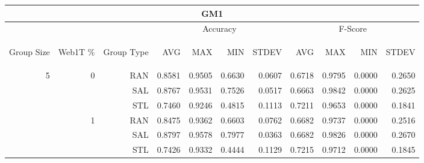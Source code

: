 \begin{center}
\begin{table}[htbp] 
 \begin{center}
\begin{tabular}{ | r | r | r | r | r | r | r | r | r | r | r |}
\hline
\multicolumn{11}{|c|}{GM1}\\
\hline
 & & & \multicolumn{4}{|c|}{Accuracy} & \multicolumn{4}{|c|}{F-Score}\\ \cline{4-11}
\begin{sideways}Group Size\end{sideways} & \begin{sideways}Web1T \%\end{sideways} & \begin{sideways}Group Type\end{sideways} & \begin{sideways}AVG\end{sideways} & \begin{sideways}MAX\end{sideways} & \begin{sideways}MIN\end{sideways} & \begin{sideways}STDEV\end{sideways} & \begin{sideways}AVG\end{sideways} & \begin{sideways}MAX\end{sideways} & \begin{sideways}MIN\end{sideways} & \begin{sideways}STDEV\end{sideways}\\
\hline
\multirow{18}{*}{5}
 & \multirow{3}{*}{0} & RAN & 0.8581 & 0.9505 & 0.6630 & 0.0607 & 0.6718 & 0.9795 & 0.0000 & 0.2650\\ \cline{3-11}
 &   & SAL & 0.8767 & 0.9531 & 0.7526 & 0.0517 & 0.6663 & 0.9842 & 0.0000 & 0.2625\\ \cline{3-11}
 &   & STL & 0.7460 & 0.9246 & 0.4815 & 0.1113 & 0.7211 & 0.9653 & 0.0000 & 0.1841\\ \cline{2-11}
 & \multirow{3}{*}{1} & RAN & 0.8475 & 0.9362 & 0.6603 & 0.0762 & 0.6682 & 0.9737 & 0.0000 & 0.2516\\ \cline{3-11}
 &   & SAL & 0.8797 & 0.9578 & 0.7977 & 0.0363 & 0.6682 & 0.9826 & 0.0000 & 0.2670\\ \cline{3-11}
 &   & STL & 0.7426 & 0.9332 & 0.4444 & 0.1129 & 0.7215 & 0.9712 & 0.0000 & 0.1845\\ \cline{2-11}

\end{tabular}
\end{center}
\end{table}
\end{center}
